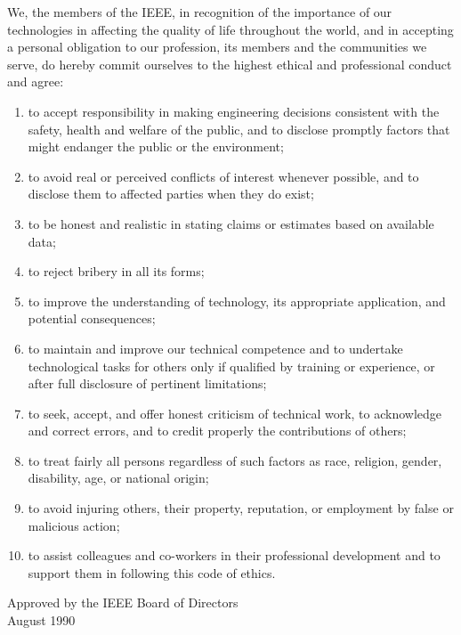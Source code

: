 %
%
%
We, the members of the IEEE, in recognition of the importance of our technologies in affecting the quality of life throughout the world, and in accepting a personal obligation to our profession, its members and the communities we serve, do hereby commit ourselves to the highest ethical and professional conduct and agree:
\begin{enumerate}
\item to accept responsibility in making engineering decisions consistent with the safety, health and welfare of the public, and to disclose promptly factors that might endanger the public or the environment; 
\item	to avoid real or perceived conflicts of interest whenever possible, and to disclose them to affected parties when they do exist; 
\item	to be honest and realistic in stating claims or estimates based on available data; 
\item	to reject bribery in all its forms; 
\item	to improve the understanding of technology, its appropriate application, and potential consequences; 
\item	to maintain and improve our technical competence and to undertake technological tasks for others only if qualified by training or experience, or after full disclosure of pertinent limitations; 
\item	to seek, accept, and offer honest criticism of technical work, to acknowledge and correct errors, and to credit properly the contributions of others; 
\item	to treat fairly all persons regardless of such factors as race, religion, gender, disability, age, or national origin; 
\item	to avoid injuring others, their property, reputation, or employment by false or malicious action; 
\item	to assist colleagues and co-workers in their professional development and to support them in following this code of ethics. 
\end{enumerate}

\begin{flushright}
Approved by the IEEE Board of Directors\\ 
August 1990
\end{flushright}
